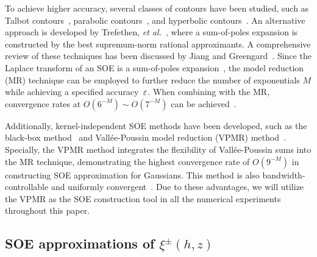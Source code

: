 To achieve higher accuracy, several classes of contours have been studied, such as Talbot contours~\cite{lin2004numerical}, parabolic contours~\cite{makarov2000exponentially}, and hyperbolic contours~\cite{lopez2004numerical}. 
An alternative approach is developed by Trefethen, \emph{et al.}~\cite{trefethen2006talbot}, where a sum-of-poles expansion is constructed by the best supremum-norm rational approximants.
A comprehensive review of these techniques has been discussed by Jiang and Greengard~\cite{jiang2021approximating}.
Since the Laplace transform of an SOE is a sum-of-poles expansion~\cite{greengard2018anisotropic}, the model reduction (MR) technique can be employed to further reduce the number of exponentials $M$ while achieving a specified accuracy~$\varepsilon$.
When combining with the MR, convergence rates at $O(6^{-M}) \sim O(7^{-M})$ can be achieved~\cite{jiang2021approximating}.

Additionally, kernel-independent SOE methods have been developed, such as the black-box method~\cite{greengard2018anisotropic} and Vall\'ee-Poussin model reduction (VPMR) method~\cite{gao2021kernelindependent}. 
Specially, the VPMR method integrates the flexibility of Vall\'ee-Poussin sums into the MR technique, demonstrating the highest convergence rate of $O(9^{-M})$ in constructing SOE approximation for Gaussians. 
This method is also bandwidth-controllable and uniformly convergent~\cite{AAMM-13-1126}. 
Due to these advantages, we will utilize the VPMR as the SOE construction tool in all the numerical experiments throughout this paper.




\subsection{SOE approximations of $\xi^{\pm}(h,z)$} \label{subsec::SOEapp}

